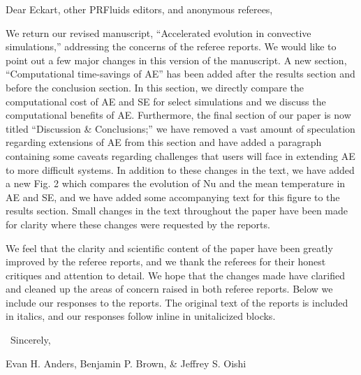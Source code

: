 \documentclass[aps, 11pt, singlecolumn]{revtex4-1} %
\begin{document}
\newenvironment{myquotation}{
\begin{quotation}
\itshape
}{ 
\end{quotation}
}
\noindent
Dear Eckart, other PRFluids editors, and anonymous referees,
$\,$\newline

\begin{singlespace}
We return our revised manuscript, ``Accelerated evolution in
convective simulations,'' addressing the concerns of the referee reports.
We would like to point out a few major changes in this version of the manuscript.
A new section, ``Computational time-savings of AE'' has been added after the
results section and before the conclusion section. In this section, we directly
compare the computational cost of AE and SE for select simulations and we discuss
the computational benefits of AE.  Furthermore, the final section of our paper
is now titled ``Discussion \& Conclusions;'' we have removed a vast amount
of speculation regarding extensions of AE from this section and have added
a paragraph containing some caveats regarding challenges that users will face in
extending AE to more difficult systems.  In addition to these changes in the text,
we have added a new Fig. 2 which compares the evolution of Nu and the
mean temperature in AE and SE, and we have added some accompanying text for this
figure to the results section.  Small changes in the text throughout the paper have
been made for clarity where these changes were requested by the reports.

We feel that the clarity and scientific content of the paper have been greatly
improved by the referee reports, and we thank the referees for their honest 
critiques and attention to detail. We hope that the changes made have clarified
and cleaned up the areas of concern raised in both referee reports.  Below we
include our responses to the reports. The original text of the reports is included
in italics, and our responses follow inline in unitalicized blocks.

$\,$\newline
\noindent
Sincerely,

Evan H. Anders, Benjamin P. Brown, \& Jeffrey S. Oishi





\end{singlespace}
\end{document}
